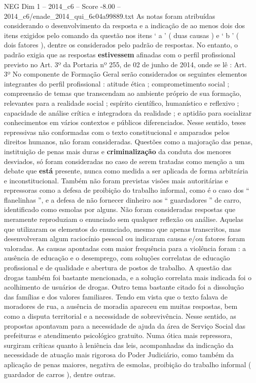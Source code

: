 \begin{textsample}{NEG Dim 1 – 2014\_c6 – Score -8.00 – 2014\_c6/enade\_2014\_qui\_6c04a99889.txt}
As notas foram atribuídas considerando o desenvolvimento da resposta e a indicação de ao menos dois dos itens exigidos pelo comando da questão nos itens ‘ a ’ ( duas causas ) e ‘ b ’ ( dois fatores ), dentre os considerados pelo padrão de respostas.
No entanto, o padrão exigia que as respostas \textbf{estivessem} afinadas com o perfil profissional previsto no Art. 3º da Portaria nº 255, de 02 de junho de 2014, onde se lê : Art. 3º No componente de Formação Geral serão considerados os seguintes elementos integrantes do perfil profissional : atitude ética ; comprometimento social ; compreensão de temas que transcendam ao ambiente próprio de sua formação, relevantes para a realidade social ; espírito científico, humanístico e reflexivo ; capacidade de análise crítica e integradora da realidade ; e aptidão para socializar conhecimentos em vários contextos e públicos diferenciados.
Nesse sentido, teses repressivas não conformadas com o texto constitucional e amparados pelos direitos humanos, não foram consideradas.
Questões como a majoração das penas, instituição de penas mais duras e \textbf{criminalização} da conduta dos menores desviados, só foram consideradas no caso de serem tratadas como menção a um debate que \textbf{está} presente, nunca como medida a ser aplicada de forma arbitrária e inconstitucional.
Também não foram previstas visões mais autoritárias e repressoras como a defesa de proibição do trabalho informal, como é o caso dos “ flanelinhas ”, e a defesa de não fornecer dinheiro aos “ guardadores ” de carro, identificado como esmolas por alguns.
Não foram consideradas respostas que meramente reproduziam o enunciado sem qualquer reflexão ou análise.
Aquelas que utilizaram os elementos do enunciado, mesmo que apenas transcritos, mas desenvolveram algum raciocínio pessoal ou indicaram causas e/ou fatores foram valoradas.
As causas apontadas com maior frequência para a violência foram : a ausência de educação e o desemprego, com soluções correlatas de educação profissional e de qualidade e abertura de postos de trabalho.
A questão das drogas também foi bastante mencionada, e a solução correlata mais indicada foi o acolhimento de usuários de drogas.
Outro tema bastante citado foi a dissolução das famílias e dos valores familiares.
Tendo em vista que o texto falava de moradores de rua, a ausência de moradia apareceu em muitas respostas, bem como a disputa territorial e a necessidade de sobrevivência.
Nesse sentido, as propostas apontavam para a necessidade de ajuda da área de Serviço Social das prefeituras e atendimento psicológico gratuito.
Numa ótica mais repressora, surgiram críticas quanto à leniência das leis, acompanhadas da indicação da necessidade de atuação mais rigorosa do Poder Judiciário, como também da aplicação de penas maiores, negativa de esmolas, proibição do trabalho informal ( guardador de carros ), dentre outras.

\end{textsample}
